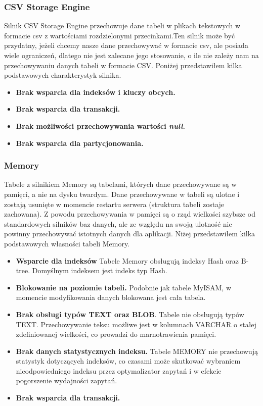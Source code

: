 \subsubsection{CSV Storage Engine}
Silnik CSV Storage Engine przechowuje dane tabeli w plikach tekstowych w formacie csv z wartościami rozdzielonymi przecinkami.Ten silnik może być przydatny, jeżeli chcemy nasze dane przechowywać w formacie csv, ale posiada wiele ograniczeń, dlatego nie jest zalecane jego stosowanie, o ile nie zależy nam na przechowywaniu danych tabeli w formacie CSV.
Poniżej przedstawiłem kilka podstawowych charakterystyk silnika.
\begin{itemize}
	\item \textbf{Brak wsparcia dla indeksów i kluczy obcych.}
	\item \textbf{Brak wsparcia dla transakcji.}
	\item \textbf{Brak możliwości przechowywania wartości \textit{null}.}
	\item \textbf{Brak wsparcia dla partycjonowania.}
\end{itemize}

\subsubsection{Memory}
Tabele z silnikiem Memory są tabelami, których dane przechowywane są w pamięci, a nie na dysku twardym. Dane przechowywane w tabeli są ulotne i zostają usunięte w momencie restartu serwera (struktura tabeli zostaje zachowana). Z powodu przechowywania w pamięci są o rząd wielkości szybsze od standardowych silników baz danych, ale ze względu na swoją ulotność nie powinny przechowywać istotnych danych dla aplikacji.
Niżej przedstawiłem kilka podstawowych własności tabeli Memory.
\begin{itemize}
	\item \textbf{Wsparcie dla indeksów} Tabele Memory obsługują indeksy Hash oraz B-tree. Domyślnym indeksem jest indeks typ Hash.
	\item \textbf{Blokowanie na poziomie tabeli.} Podobnie jak tabele MyISAM, w momencie modyfikowania danych blokowana jest cała tabela.
	\item \textbf{Brak obsługi typów TEXT oraz BLOB}. Tabele nie obsługują typów TEXT. Przechowywanie teksu możliwe jest w kolumnach VARCHAR o stałej zdefiniowanej wielkości, co prowadzi do marnotrawienia pamięci.
	\item \textbf{Brak danych statystycznych indeksu.} Tabele MEMORY nie przechowują statystyk dotyczących indeksów, co czasami może skutkować wybraniem nieodpowiedniego indeksu przez optymalizator zapytań i w efekcie pogorszenie wydajności zapytań.
	\item \textbf{Brak wsparcia dla transakcji.}
\end{itemize}

